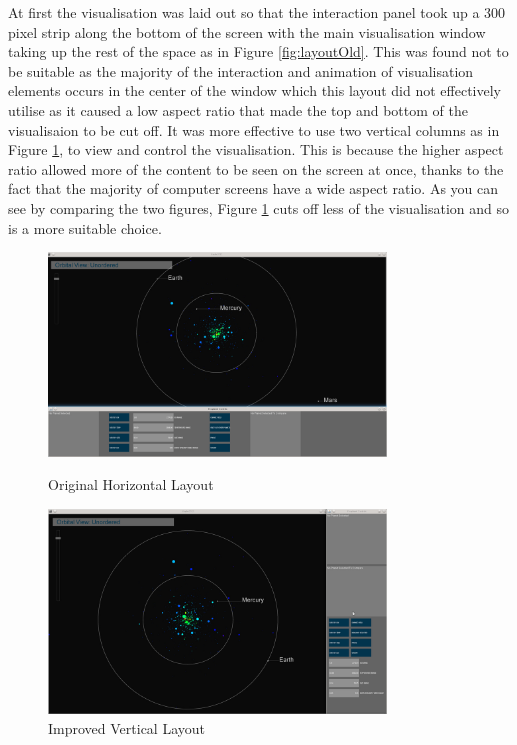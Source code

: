 At first the visualisation was laid out so that the interaction panel took up a
300 pixel strip along the bottom of the screen with the main visualisation
window
taking up the rest of the space as in Figure \ref{fig:layoutOld}.
 This was found not to be suitable as the majority of the interaction and
animation of visualisation elements occurs
in the center of the window which this layout did not effectively utilise as it
caused a low aspect ratio that made the top and bottom of the visualisaion to be
cut off. It
was more effective to use two vertical columns as in Figure \ref{fig:layoutNew},
to view and control the visualisation. This is because
the higher aspect ratio allowed more of the content to be seen on the
screen at once, thanks to the fact that the majority of computer screens have a
wide aspect ratio. As you can see by comparing the two figures, Figure
\ref{fig:layoutNew} cuts off less of the visualisation and so is a more suitable
choice.

\begin{figure}[H]
  \centering
      \includegraphics[width=0.8\textwidth]{images/layout_horizontal.jpg}
  \caption{Original Horizontal Layout}  
    \label{fig:layoutOld}
        \includegraphics[width=0.8\textwidth]{images/layout_vertical.jpg}
  \caption{Improved Vertical Layout}
  \label{fig:layoutNew}
\end{figure}

